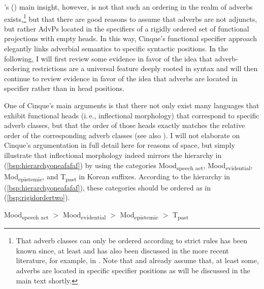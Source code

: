 \citeauthor{cinque1999adverbs}'s (\citeyear{cinque1999adverbs}) main insight, however, is not that such an ordering in the realm of adverbs exists,\footnote{ That adverb classes can only be ordered according to strict rules has been known since, at least \citet[622]{curme1905grammar} and has also been discussed in the more recent literature, for example, in \citet{jackendoff1972semantic, travis1988syntax, sportiche1988theory, alexiadou1997adverb, laenzlinger1998comparative}. Note that \citet{alexiadou1997adverb} and \citet{laenzlinger1998comparative} already assume that, at least some, adverbs are located in specific specifier positions as will be discussed in the main text shortly.} but that there are good reasons to assume that adverbs are not adjuncts, but rather AdvPs located in the specifiers of a rigidly ordered set of functional projections with empty heads. In this way, Cinque's functional specifier approach elegantly links adverbial semantics to specific syntactic positions. In the following, I will first review some evidence in favor of the idea that adverb-ordering restrictions are a universal feature deeply rooted in syntax and will then continue to review evidence in favor of the idea that adverbs are located in specifier rather than in head positions.

One of Cinque's main arguments is that there not only exist many languages that exhibit functional heads (i.\,e., inflectional morphology) that correspond to specific adverb classes, but that the order of those heads exactly matches the relative order of the corresponding adverb classes (see also \citealt{cinque2004issues}). I will not elaborate on Cinque's argumentation in full detail here for reasons of space, but simply illustrate that inflectional morphology indeed mirrors the hierarchy in (\ref{bsp:hierarchyoneafafaf}) by using the categories Mood\textsubscript{speech act}, Mood\textsubscript{evidential}, Mod\textsubscript{epistemic}, and T\textsubscript{past} in Korean suffixes. According to the hierarchy in (\ref{bsp:hierarchyoneafafaf}), these categories should be ordered as in (\ref{bsp:rigidordertwo}).

\begin{exe}
\ex\label{bsp:rigidordertwo} 
Mood\textsubscript{speech act} $>$ Mood\textsubscript{evidential} $>$ Mod\textsubscript{epistemic} $>$ T\textsubscript{past} 
\end{exe}

